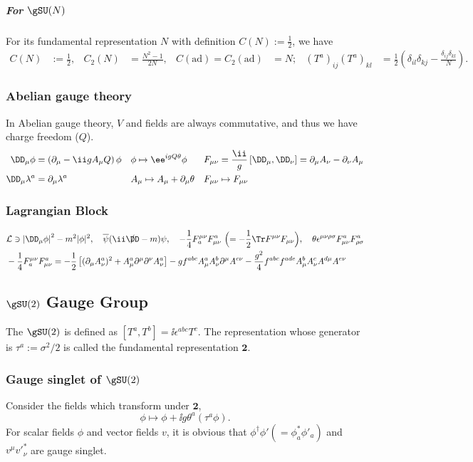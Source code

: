 \subparagraph{For $\gSU(N)$}For its fundamental representation $N$ with definition $C(N):=\frac12$, we have
\begin{align*}
  C(N)&:=\frac12, & C_2(N)&= \frac{N^2-1}{2N}, & C(\text{ad}) =
 C_2(\text{ad}) &= N;&
  (T^a)_{ij}(T^a)_{kl} &= \frac12\left(\delta_{il}\delta_{kj}-\frac{\delta_{ij}\delta_{kl}}{N}\right).
\end{align*}

\subsubsection{Abelian gauge theory}\label{sec:abelian-gauge-theory}
In Abelian gauge theory, $V$ and fields are always commutative, and thus we have charge freedom ($Q$).
\begin{align*}
 \Dm\phi           &=       \left(\Pm-\ii g A_\mu Q\right)\phi&
 &\phi              \mapsto  \ee^{igQ\theta}\phi&
 &F_{\mu\nu}        =       \frac\ii g\left[\Dm,\Dn\right] = \Pm A_\nu-\Pn A_\mu\\
 \Dm\lambda^a     &=       \Pm\lambda^a&
 &A_\mu             \mapsto  A_\mu + \Pm\theta&
 &F_{\mu\nu}        \mapsto  F_{\mu\nu}
\end{align*}

\subsubsection{Lagrangian Block}\vspace{-2em}
\begin{align}
 &\Lag \ni \left|\Dm\phi\right|^2-m^2|\phi|^2, \quad
          \overline\psi(\ii\slashed\DD-m)\psi,\quad
          -\frac14F_a^{\mu\nu}F^a_{\mu\nu}\ \Bigl(=-\frac12\Tr F^{\mu\nu}F_{\mu\nu}\Bigr),\quad
          \theta\epsilon^{\mu\nu\rho\sigma}F^a_{\mu\nu}F^a_{\rho\sigma}\\
 &-\frac14F_a^{\mu\nu}F^a_{\mu\nu}
  = -\frac12\left[
       (\Pm A^a_\nu)^2 +A^a_\mu\Pmu\Pnu A^a_\nu
 \right]
    - gf^{abc}A_\mu^a A_\nu^b \Pmu A^{c\nu}
    - \frac{g^2}4 f^{abc}f^{ade}A^b_\mu A^c_\nu A^{d\mu}A^{e\nu}
\end{align}

\subsection{$\gSU(2)$ Gauge Group}
The $\gSU(2)$ is defined as $[T^a,T^b]=\ii\epsilon^{abc}T^c$.
The representation whose generator is $\tau^a:=\sigma^2/2$ is called the fundamental representation $\boldsymbol 2$.
\subsubsection{Gauge singlet of $\gSU(2)$}
Consider the fields which transform under $\boldsymbol2$,
\begin{equation}
 \phi\mapsto \phi+\ii g\theta^a\left(\tau^a\phi\right).
\end{equation}
For scalar fields $\phi$ and vector fields $v$, it is obvious that $\phi^\dagger\phi' (=\phi^*_a \phi'_a)$ and $v^\mu v'^*_\nu$ are gauge singlet.


